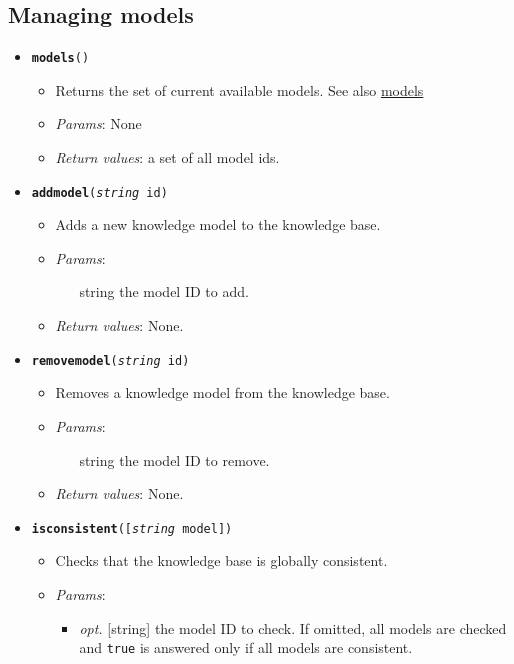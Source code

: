 \subsection{Managing models}


\begin{itemize}
\item  \texttt{\textbf{models}()}
\begin{itemize}
\item  Returns the set of current available models. See also \hyperref[ac5552fd6a3c08ad22387efbe42d137d]{models}
\item  \emph{Params}: None
\item  \emph{Return values}: a set of all model ids.
\end{itemize}

\item  \texttt{\textbf{addmodel}(\emph{string} id)}
\begin{itemize}
\item  Adds a new knowledge model to the knowledge base.
\item  \emph{Params}:
\begin{itemize}
\item  [string] the model ID to add.
\end{itemize}

\item  \emph{Return values}: None.
\end{itemize}

\item  \texttt{\textbf{removemodel}(\emph{string} id)}
\begin{itemize}
\item  Removes a knowledge model from the knowledge base.
\item  \emph{Params}:
\begin{itemize}
\item  [string] the model ID to remove.
\end{itemize}

\item  \emph{Return values}: None.
\end{itemize}

\item  \texttt{\textbf{isconsistent}([\emph{string} model])}
\begin{itemize}
\item  Checks that the knowledge base is globally consistent.
\item  \emph{Params}:
\begin{itemize}
\item  \emph{opt.} [string] the model ID to check. If omitted, all models are checked and \texttt{true} is answered only if all models are consistent. 
\end{itemize}


\end{itemize}
\end{itemize}
